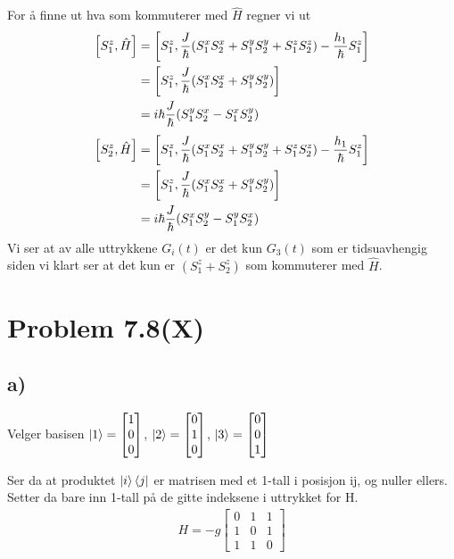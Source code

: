 \documentclass[norsk,a4paper,12pt]{article}
\begin{document}
	For å finne ut hva som kommuterer med $\hat{H}$ regner vi ut
	\begin{equation}
	\begin{aligned}
	\comm{S_1^z}{\hat{H}} &= \comm{S_1^z}{\frac{J}{\hbar} (S_1^x S_2^x + S_1^y S_2^y + S_1^z S_2^z) - \frac{h_1}{\hbar} S_1^z} \\
	&= \comm{S_1^z}{\frac{J}{\hbar} (S_1^x S_2^x + S_1^y S_2^y)} \\
	&= i\hbar \frac{J}{\hbar} (S_1^y S_2^x - S_1^x S_2^y)
	\end{aligned}
	\end{equation}
	\begin{equation}
	\begin{aligned}
	\comm{S_2^z}{\hat{H}} &= \comm{S_1^z}{\frac{J}{\hbar} (S_1^x S_2^x + S_1^y S_2^y + S_1^z S_2^z) - \frac{h_1}{\hbar} S_1^z} \\
	&= \comm{S_1^z}{\frac{J}{\hbar} (S_1^x S_2^x + S_1^y S_2^y)} \\
	&= i\hbar \frac{J}{\hbar} (S_1^x S_2^y - S_1^y S_2^x)
	\end{aligned}
	\end{equation}
	Vi ser at av alle uttrykkene $G_i(t)$ er det kun $G_3(t)$ som er tidsuavhengig siden vi klart ser at det kun er $(S_1^z + S_2^z)$ som kommuterer med $\hat{H}$.
	
\section*{Problem 7.8(X)}

	\subsection*{a)}
	Velger basisen $\ket{1} = \left[ \begin{matrix} 1 \\ 0 \\ 0 \end{matrix} \right]$, $\ket{2} = \left[ \begin{matrix} 0 \\ 1 \\ 0 \end{matrix} \right]$, $\ket{3} = \left[ \begin{matrix} 0 \\ 0 \\ 1 \end{matrix} \right]$
	
	Ser da at produktet $\ket{i}\bra{j}$ er matrisen med et 1-tall i posisjon ij, og nuller ellers. Setter da bare inn 1-tall på de gitte indeksene i uttrykket for H.
	\begin{equation}
	\begin{aligned}
	H = -g \left[ \begin{matrix} 0 & 1 & 1 \\ 1 & 0 & 1 \\ 1 & 1 & 0 \end{matrix} \right]
	\end{aligned}
	\end{equation}
	
\end{document}
